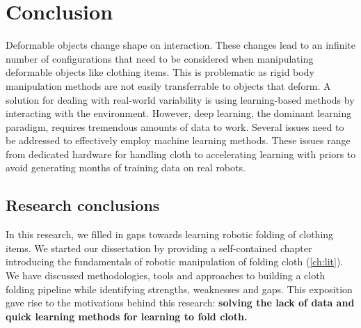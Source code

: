 \documentclass[\home/main.tex]{subfiles}
\begin{document}

\chapter{Conclusion}\label{ch:conclusion}

Deformable objects change shape on interaction. These changes lead to an infinite number of configurations that need to be considered when manipulating deformable objects like clothing items. This is problematic as rigid body manipulation methods are not easily transferrable to objects that deform.
A solution for dealing with real-world variability is using learning-based methods by interacting with the environment. However, deep learning, the dominant learning paradigm, requires tremendous amounts of data to work. Several issues need to be addressed to effectively employ machine learning methods. These issues range from dedicated hardware for handling cloth to accelerating learning with priors to avoid generating months of training data on real robots.

\section{Research conclusions} \label{sec:conc_research}
In this research, we filled in gaps towards learning robotic folding of clothing items.
We started our dissertation by providing a self-contained chapter introducing the fundamentals of robotic manipulation of folding cloth (\cref{ch:lit}). We have discussed methodologies, tools and approaches to building a cloth folding pipeline while identifying strengths, weaknesses and gaps. This exposition gave rise to the motivations behind this research: \textbf{solving the lack of data and quick learning methods for learning to fold cloth.}
\end{document}
